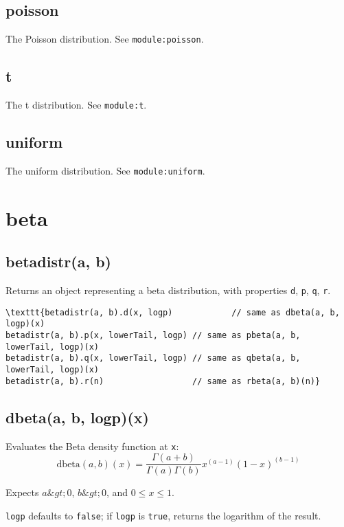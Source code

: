 \documentclass{article}
\begin{document}
    \subsection*{poisson}
    The Poisson distribution. See \texttt{module:poisson}.


    \subsection*{t}
    The t distribution. See \texttt{module:t}.


    \subsection*{uniform}
    The uniform distribution. See \texttt{module:uniform}.


  \section{beta}
    \subsection*{betadistr(a, b)}
    Returns an object representing a beta distribution, with properties \texttt{d}, \texttt{p}, \texttt{q}, \texttt{r}.


\begin{lstlisting}
\texttt{betadistr(a, b).d(x, logp)            // same as dbeta(a, b, logp)(x)
betadistr(a, b).p(x, lowerTail, logp) // same as pbeta(a, b, lowerTail, logp)(x)
betadistr(a, b).q(x, lowerTail, logp) // same as qbeta(a, b, lowerTail, logp)(x)
betadistr(a, b).r(n)                  // same as rbeta(a, b)(n)}\end{lstlisting}

    \subsection*{dbeta(a, b, logp)(x)}
    Evaluates the Beta density function at \texttt{x}:
$$\textrm{dbeta}(a,b)(x) = \frac{\Gamma(a+b)}{\Gamma(a)\Gamma(b)}x^{(a-1)}(1-x)^{(b-1)}$$


Expects $a \&gt; 0$, $b \&gt; 0$, and $0 \leq x \leq 1$.


\texttt{logp} defaults to \texttt{false}; if \texttt{logp} is \texttt{true}, returns the
logarithm of the result.
\end{document}
